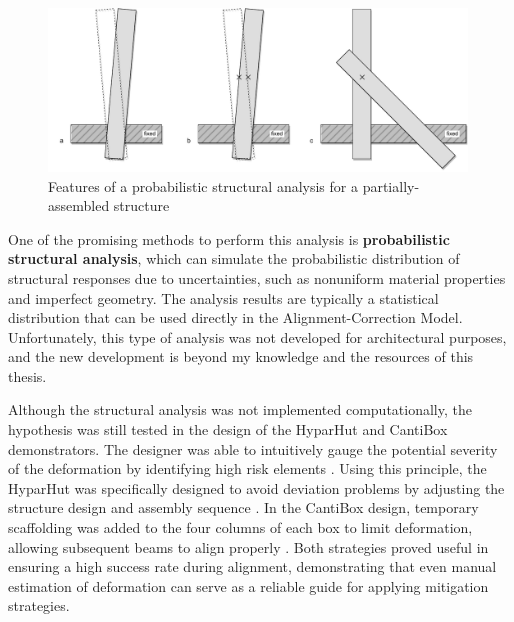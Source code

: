 \begin{figure}[h]
    \centering
    \includegraphics[width=0.99\textwidth]{images/09/Nondeterministic Alignment Target.pdf}
    \caption{Features of a probabilistic structural analysis for a partially-assembled structure}
    \label{fig:probabilistic-structural-analysis}
\end{figure}

One of the promising methods to perform this analysis is \textbf{probabilistic structural analysis}, which can simulate the probabilistic distribution of structural responses due to uncertainties, such as nonuniform material properties and imperfect geometry\parencite{cruseProbabilisticStructuralAnalysis1988, kohlerProbabilisticModelingTimber2007}. The analysis results are typically a statistical distribution that can be used directly in the Alignment-Correction Model. Unfortunately, this type of analysis was not developed for architectural purposes, and the new development is beyond my knowledge and the resources of this thesis. 

Although the structural analysis was not implemented computationally, the hypothesis was still tested in the design of the HyparHut and CantiBox demonstrators. The designer was able to intuitively gauge the potential severity of the deformation by identifying high risk elements . Using this principle, the HyparHut was specifically designed to avoid deviation problems by adjusting the structure design and assembly sequence . In the CantiBox design, temporary scaffolding was added to the four columns of each box to limit deformation, allowing subsequent beams to align properly . Both strategies proved useful in ensuring a high success rate during alignment, demonstrating that even manual estimation of deformation can serve as a reliable guide for applying mitigation strategies. 

